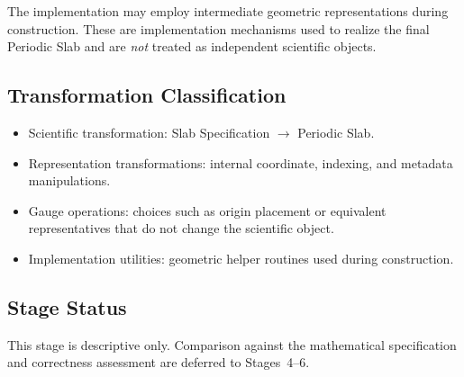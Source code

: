The implementation may employ intermediate geometric representations during
construction. These are implementation mechanisms used to realize the final
Periodic Slab and are \emph{not} treated as independent scientific objects.

\subsection{Transformation Classification}

\begin{itemize}
\item Scientific transformation: Slab Specification $\rightarrow$ Periodic Slab.
\item Representation transformations: internal coordinate, indexing, and
metadata manipulations.
\item Gauge operations: choices such as origin placement or equivalent
representatives that do not change the scientific object.
\item Implementation utilities: geometric helper routines used during
construction.
\end{itemize}

\subsection{Stage Status}

This stage is descriptive only. Comparison against the mathematical
specification and correctness assessment are deferred to Stages~4--6.
